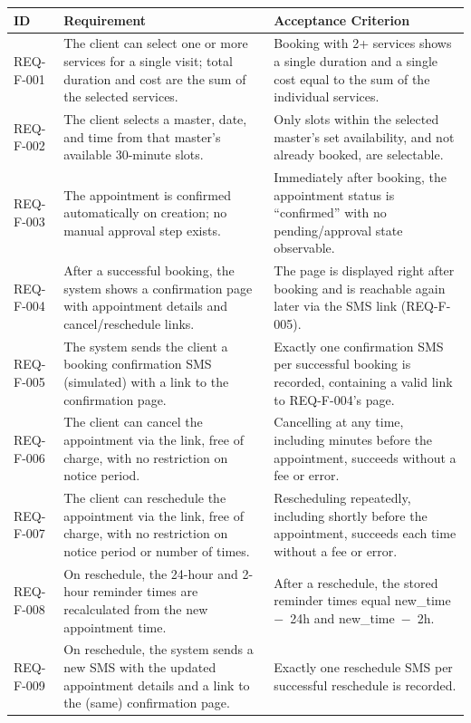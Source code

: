 \documentclass[11pt,a4paper]{article}
\begin{document}
\begin{longtable}{L{1.9cm}L{6.4cm}L{6.2cm}}
\toprule
ID & Requirement & Acceptance Criterion \\
\midrule
\endhead
REQ-F-001 & The client can select one or more services for a single visit;
  total duration and cost are the sum of the selected services. &
  Booking with 2+ services shows a single duration and a single cost equal
  to the sum of the individual services. \\
REQ-F-002 & The client selects a master, date, and time from that master's
  available 30-minute slots. & Only slots within the selected master's set
  availability, and not already booked, are selectable. \\
REQ-F-003 & The appointment is confirmed automatically on creation; no
  manual approval step exists. & Immediately after booking, the appointment
  status is ``confirmed'' with no pending/approval state observable. \\
REQ-F-004 & After a successful booking, the system shows a confirmation
  page with appointment details and cancel/reschedule links. & The page is
  displayed right after booking and is reachable again later via the SMS
  link (REQ-F-005). \\
REQ-F-005 & The system sends the client a booking confirmation SMS
  (simulated) with a link to the confirmation page. & Exactly one
  confirmation SMS per successful booking is recorded, containing a valid
  link to REQ-F-004's page. \\
REQ-F-006 & The client can cancel the appointment via the link, free of
  charge, with no restriction on notice period. & Cancelling at any time,
  including minutes before the appointment, succeeds without a fee or
  error. \\
REQ-F-007 & The client can reschedule the appointment via the link, free of
  charge, with no restriction on notice period or number of times. &
  Rescheduling repeatedly, including shortly before the appointment,
  succeeds each time without a fee or error. \\
REQ-F-008 & On reschedule, the 24-hour and 2-hour reminder times are
  recalculated from the new appointment time. & After a reschedule, the
  stored reminder times equal new\_time~$-$~24h and new\_time~$-$~2h. \\
REQ-F-009 & On reschedule, the system sends a new SMS with the updated
  appointment details and a link to the (same) confirmation page. & Exactly
  one reschedule SMS per successful reschedule is recorded. \\

\end{longtable}
\end{document}
